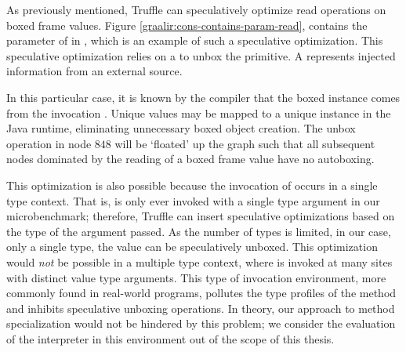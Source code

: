 As previously mentioned, Truffle can speculatively optimize read operations on boxed frame values.
Figure \ref{graalir:cons-contains-param-read}, contains the parameter of  in , which is an example of such a speculative optimization.
This speculative optimization relies on a  to unbox the primitive.
A  represents injected information from an external source.

In this particular case, it is known by the compiler that the boxed instance comes from the invocation .
Unique  values may be mapped to a unique  instance in the Java runtime, eliminating unnecessary boxed object creation.
The unbox operation in node $848$ will be `floated' up the graph such that all subsequent nodes dominated by the reading of a boxed frame value have no autoboxing.

This optimization is also possible because the invocation of  occurs in a single type context.
That is,  is only ever invoked with a single type argument in our microbenchmark; therefore, Truffle can insert speculative optimizations based on the type of the argument passed.
As the number of types is limited, in our case, only a single type, the value can be speculatively unboxed.
This optimization would \textit{not} be possible in a multiple type context, where  is invoked at many sites with distinct value type arguments.
This type of invocation environment, more commonly found in real-world programs, pollutes the type profiles of the method and inhibits speculative unboxing operations.
In theory, our approach to method specialization would not be hindered by this problem; we consider the evaluation of the interpreter in this environment out of the scope of this thesis.

